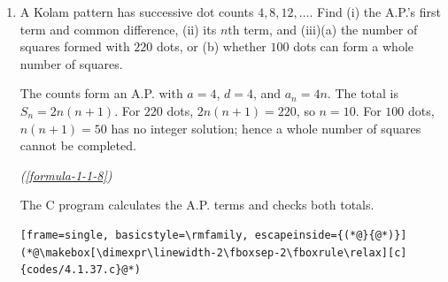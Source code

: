 \vspace{0.8em}
\begin{enumerate}[label={},font=\normalfont,leftmargin=1.15cm,labelwidth=1.0cm,labelsep=0.15cm,itemindent=0pt,listparindent=0pt,parsep=0pt,topsep=0pt]
\item[4.1.37] A Kolam pattern has successive dot counts $4,8,12,\ldots$. Find (i) the A.P.'s first term and common difference, (ii) its $n$th term, and (iii)(a) the number of squares formed with $220$ dots, or (b) whether $100$ dots can form a whole number of squares.

\vspace{0.7em}\par\solution


The counts form an A.P. with $a=4$, $d=4$, and $a_n=4n$. The total is $S_n=2n(n+1)$. For $220$ dots, $2n(n+1)=220$, so $n=10$. For $100$ dots, $n(n+1)=50$ has no integer solution; hence a whole number of squares cannot be completed.\par\noindent\hfill\mbox{\textit{(\ref{formula-1-1-8})}}\par

The C program calculates the A.P. terms and checks both totals.
\begin{lstlisting}[frame=single, basicstyle=\rmfamily, escapeinside={(*@}{@*)}]
(*@\makebox[\dimexpr\linewidth-2\fboxsep-2\fboxrule\relax][c]{codes/4.1.37.c}@*)
\end{lstlisting}
\end{enumerate}

